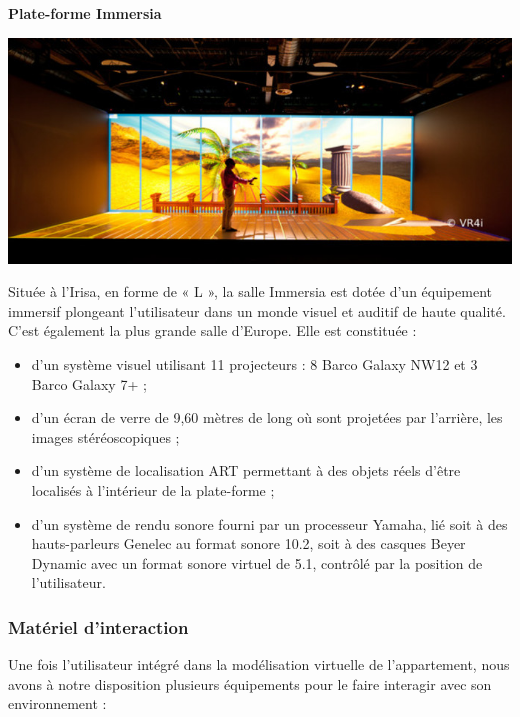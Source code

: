 \textbf{Plate-forme Immersia}
\\
		\noindent\begin{minipage}{0.3\textwidth}
			\includegraphics[width=\linewidth]{1-PreEtude/img/immersia}
			\end{minipage}
			\hfill
			\begin{minipage}{0.65\textwidth}
			Située à l'Irisa, en forme de « L », la salle Immersia est dotée d'un équipement immersif plongeant l'utilisateur dans un monde visuel et auditif de haute qualité. C'est également la plus grande salle d'Europe.
			Elle est constituée  :
			\begin{itemize}
				 \item d'un système visuel utilisant 11 projecteurs : 8 Barco Galaxy NW12 et 3 Barco Galaxy 7+ ;
				 \item d'un écran de verre de 9,60 mètres de long où sont projetées par l'arrière, les images stéréoscopiques ;
  				\item d'un système de localisation ART permettant à des objets réels d'être localisés à l'intérieur de la plate-forme ;
  				\item d'un système de rendu sonore fourni par un processeur Yamaha, lié soit à des hauts-parleurs Genelec au format sonore 10.2, soit à des casques Beyer Dynamic avec un format sonore virtuel de 5.1, contrôlé par la position de l'utilisateur.
			\end{itemize}
		\end{minipage}


\subsubsection{Matériel d'interaction}
Une fois l'utilisateur intégré dans la modélisation virtuelle de l'appartement, nous avons à notre disposition plusieurs équipements pour le faire interagir avec son environnement :
\\

